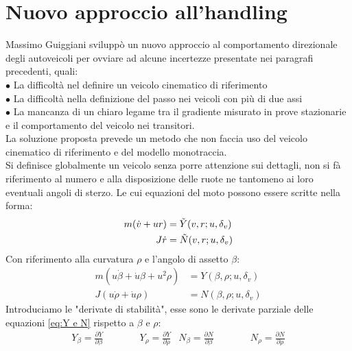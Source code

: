 \section{Nuovo approccio all'handling}
Massimo Guiggiani sviluppò un nuovo approccio al comportamento direzionale degli autoveicoli per ovviare ad alcune
incertezze presentate nei paragrafi precedenti, quali:\\
$\bullet$ La difficoltà nel definire un veicolo cinematico di riferimento\\
$\bullet$ La difficoltà nella definizione del passo nei veicoli con più di due assi\\
$\bullet$ La mancanza di un chiaro legame tra il gradiente misurato in prove stazionarie e il comportamento del veicolo nei
transitori.\\
La soluzione proposta prevede un metodo che non faccia uso del veicolo cinematico di riferimento e del modello
monotraccia.\\
Si definisce globalmente un veicolo senza porre attenzione sui dettagli, non si fà riferimento al numero e alla
disposizione delle ruote ne tantomeno ai loro eventuali angoli di sterzo.
Le cui equazioni del moto possono essere scritte nella forma:
\begin{equation} \label{eq:Y e N 1}
  \begin{split}
     m(\dot{v} + ur) & = \Tilde{Y} (v,r;u,\delta_v) \\
     J \dot{r} & = \Tilde{N} (v,r;u,\delta_v)
  \end{split}
\end{equation}
Con riferimento alla curvatura $\rho$ e l'angolo di assetto $\beta$:
\begin{equation} \label{eq:Y e N}
  \begin{split}
     m(u\dot{\beta} + \dot{u}\beta + u^2\rho) & = Y (\beta,\rho;u,\delta_v)\\
     J (u\dot{\rho} + \dot{u} \rho) & = N (\beta,\rho;u,\delta_v)
  \end{split}
\end{equation}
Introduciamo le "derivate di stabilità", esse sono le derivate parziale delle equazioni \ref{eq:Y e N} rispetto a
$\beta$ e $\rho$:
  \begin{align}
     Y_{\beta}=\frac{\partial{Y}}{\partial{\beta}} \qquad \quad &  Y_{\rho}=\frac{\partial{Y}}{\partial{\rho}} & N_{\beta}=\frac{\partial{N}}{\partial{\beta}} \qquad \quad &  N_{\rho}=\frac{\partial{N}}{\partial{\rho}}
  \end{align}
